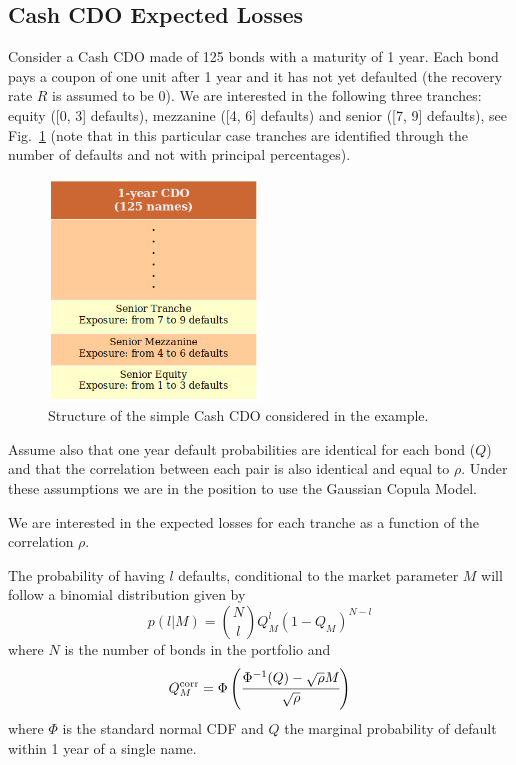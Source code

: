 \subsection{Cash CDO Expected Losses}
\label{sec:expected_losses}

Consider a Cash CDO made of 125 bonds with a maturity of 1 year. Each bond pays a coupon of one unit after 1 year and it has not yet defaulted (the recovery rate $R$ is assumed to be 0). We are interested in the following three tranches: equity ([0, 3] defaults), mezzanine ([4, 6] defaults) and senior ([7, 9] defaults), see Fig.~\ref{fig:cdo_ex_1} (note that in this particular case tranches are identified through the number of defaults and not with principal percentages). 

\begin{figure}[htb]
	\centering
	\includegraphics[width=0.5\textwidth]{figures/ex_cdo_1}
	\caption{Structure of the simple Cash CDO considered in the example.}
	\label{fig:cdo_ex_1}
\end{figure}

Assume also that one year default probabilities are identical for each bond 
($Q$) and that the correlation between each pair is also identical and equal to $\rho$.
Under these assumptions we are in the position to use the Gaussian Copula Model. 

We are interested in the expected losses for each tranche as a function of the correlation $\rho$.

The probability of having $l$ defaults, conditional to the market parameter $M$ will follow a binomial distribution given by
\begin{equation}
p(l|M) = \binom{N}{l}Q_M^l (1-Q_M)^{N-l}
\label{eq:def_prob_ex_cdo_1}
\end{equation}
where $N$ is the number of bonds in the portfolio and 
\begin{equation}
Q_M^{\textrm{corr}} = \Phi\left(\cfrac{\Phi^{-1}(Q)-\sqrt{\rho}M}{\sqrt{\-\rho}}\right)
\end{equation}
where $\Phi$ is the standard normal CDF and $Q$ the marginal probability of default 
within 1 year of a single name.

